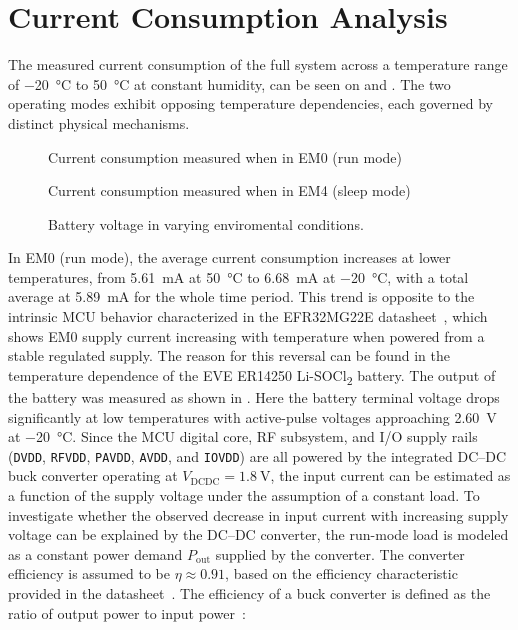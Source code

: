 \section{Current Consumption Analysis} \label{sec:Current_Cons}
The measured current consumption of the full system across a temperature range of \SI{-20}{\celsius} to \SI{+50}{\celsius} at constant humidity, can be seen on  and . The two operating modes exhibit opposing temperature dependencies, each governed by distinct physical mechanisms.

\begin{figure}[!b]
\centering

    \caption{Current consumption measured when in EM0 (run mode)}
    \label{fig:measurement}
\end{figure}

\begin{figure}[!b]
\centering

    \caption{Current consumption measured when in EM4 (sleep mode)}
    \label{fig:sleep}
\end{figure}

\begin{figure}
\centering

    \caption{Battery voltage in varying enviromental conditions.}
    \label{fig:FS_bat}
\end{figure}

In EM0 (run mode), the average current consumption increases at lower temperatures,  from \SI{5.61}{\milli\ampere} at \SI{+50}{\celsius} to \SI{6.68}{\milli\ampere} at \SI{-20}{\celsius}, with a total average at \SI{5.89}{\milli\ampere} for the whole time period. This trend is opposite to the intrinsic MCU behavior characterized in the EFR32MG22E datasheet~\cite{EFR32MG22E}, which shows EM0 supply current increasing with temperature when powered from a stable regulated supply. The reason for this reversal can be found in the temperature dependence of the EVE ER14250 Li-SOCl\textsubscript{2} battery. The output of the battery was measured as shown in . Here the battery terminal voltage drops significantly at low temperatures with active-pulse voltages approaching \SI{2.60}{\volt} at \SI{-20}{\celsius}. 
Since the MCU digital core, RF subsystem, and I/O supply rails (\texttt{DVDD}, \texttt{RFVDD}, \texttt{PAVDD}, \texttt{AVDD}, and \texttt{IOVDD}) are all powered by the integrated DC--DC buck converter operating at \(V_{\mathrm{DCDC}}=\SI{1.8}{\volt}\), the input current can be estimated as a function of the supply voltage under the assumption of a constant load. To investigate whether the observed decrease in input current with increasing supply voltage can be explained by the DC--DC converter, the run-mode load is modeled as a constant power demand \(P_{\mathrm{out}}\) supplied by the converter. The converter efficiency is assumed to be \(\eta \approx 0.91\), based on the efficiency characteristic provided in the datasheet~\cite{EFR32MG22E}. The efficiency of a buck converter is defined as the ratio of output power to input power~\cite[p.~93]{erickson2020fundamentals}:

